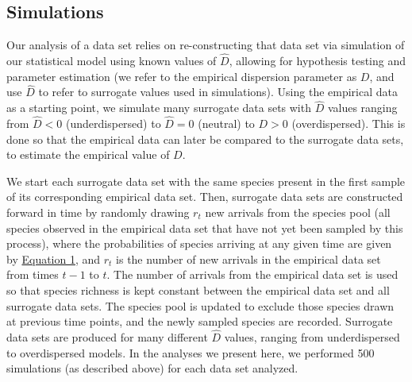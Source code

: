 \documentclass{article}
\begin{document}
\subsection{Simulations} \label{sec:simulations}
Our analysis of a data set relies on re-constructing that data set via simulation of our statistical model using known values of \(\hat{D}\), allowing for hypothesis testing and parameter estimation (we refer to the empirical dispersion parameter as \(D\), and use \(\hat{D}\) to refer to surrogate values used in simulations). Using the empirical data as a starting point, we simulate many surrogate data sets with \(\hat{D}\) values ranging from \(\hat{D}<0\) (underdispersed) to \(\hat{D}=0\) (neutral) to \(D>0\) (overdispersed). This is done so that the empirical data can later be compared to the surrogate data sets, to estimate the empirical value of \(D\).
\par
We start each surrogate data set with the same species present in the first sample of its corresponding empirical data set. Then, surrogate data sets are constructed forward in time by randomly drawing \(r_t\) new arrivals from the species pool (all species observed in the empirical data set that have not yet been sampled by this process), where the probabilities of species arriving at any given time are given by  \hyperref[sec:equation1]{Equation 1}, and \(r_t\) is the number of new arrivals in the empirical data set from times \(t-1\) to \(t\). The number of arrivals from the empirical data set is used so that species richness is kept constant between the empirical data set and all surrogate data sets. The species pool is updated to exclude those species drawn at previous time points, and the newly sampled species are recorded. Surrogate data sets are produced for many different \(\hat{D}\) values, ranging from underdispersed to overdispersed models. In the analyses we present here, we performed 500 simulations (as described above) for each data set analyzed.
\end{document}
